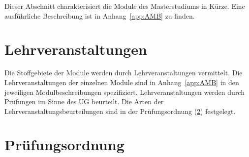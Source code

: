 Dieser Abschnitt charakterisiert die Module des Masterstudiums
\emph{} in Kürze. Eine ausführliche Beschreibung ist in
Anhang~\ref{app:AMB} zu finden.

%

\section{Lehrveranstaltungen}\label{sec:LVS}

Die Stoffgebiete der Module werden durch Lehrveranstaltungen
vermittelt.  Die Lehrveranstaltungen der einzelnen Module sind in
Anhang~\ref{app:AMB} in den jeweiligen Modulbeschreibungen
spezifiziert.  Lehrveranstaltungen werden durch Prüfungen im Sinne des
UG beurteilt.  Die Arten der Lehrveranstaltungsbeurteilungen sind in
der Prüfungsordnung (\ref{sec:PO}) festgelegt.

\section{Prüfungsordnung}\label{sec:PO}

